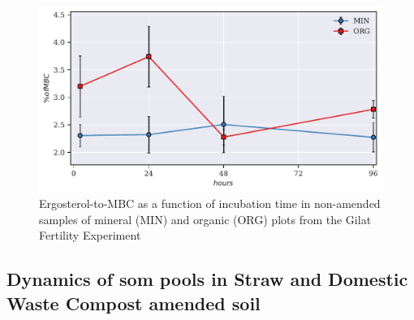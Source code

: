 			\begin{figure}[H]
				\centering
				\includegraphics[scale=0.8]{thesis_figures/preliminary/control/Erg-to-MBC_.pdf}
				\caption{Ergosterol-to-MBC  as a function of incubation time in non-amended samples  of mineral (MIN) and organic (ORG) plots from the Gilat Fertility Experiment}
				\label{fig:erg_to_mbc_control_preliminary}
			\end{figure}
%

    \subsection{Dynamics of \gls{som} pools in Straw and Domestic Waste Compost amended soil}


